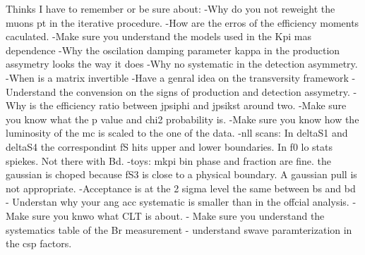 

Thinks I have to remember or be sure about:
-Why do you not reweight the muons pt in the iterative procedure.
-How are the erros of the efficiency moments caculated.
-Make sure you understand the models used in the Kpi mas dependence
-Why the oscilation damping parameter kappa in the production assymetry looks the way it does
-Why no systematic in the detection asymmetry.
-When is a matrix invertible
-Have a genral idea on the transversity framework
-Understand the convension on the signs of production and detection assymetry.
-Why is the efficiency ratio between jpsiphi and jpsikst around two.
-Make sure you know what the p value and chi2 probability is.
-Make sure you know how the luminosity of the mc is scaled to the one of the data.
-nll scans:
    In deltaS1 and deltaS4 the correspondint fS hits upper and lower boundaries.
    In f0 lo stats spiekes. Not there with Bd.
-toys:
    mkpi bin phase and fraction are fine. the gaussian is choped because fS3 is close to a physical boundary. A gaussian pull is not appropriate.
-Acceptance is at the 2 sigma level the same between bs and bd
- Understan why your ang acc systematic is smaller than in the offcial analysis.
- Make sure you knwo what CLT is about.
- Make sure you understand the systematics table of the Br measurement
- understand swave paramterization in the csp factors.

